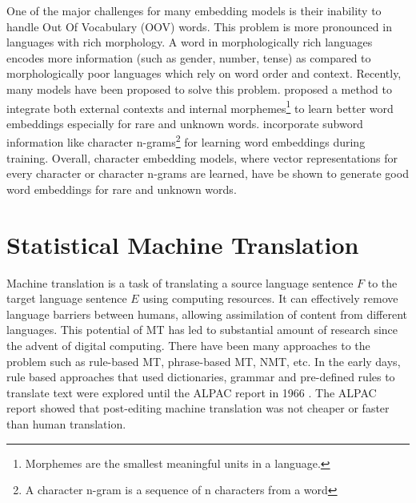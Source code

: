 One of the major challenges for many embedding models is their inability to handle Out Of Vocabulary (OOV) words.  This problem is more pronounced in languages with rich morphology. A word in morphologically rich languages encodes more information (such as gender, number, tense) as compared to morphologically poor languages which rely on word order and context. Recently, many models have been proposed to solve this problem. \cite{sun2016inside} proposed a method to integrate both external contexts and internal morphemes\footnote{Morphemes are the smallest meaningful units in a language.} to learn better word embeddings especially for rare and unknown words. \cite{bojanowski2016enriching} incorporate subword information like character n-grams\footnote{A character n-gram is a sequence of n characters from a word} for learning word embeddings during training. Overall, character embedding models, where vector representations for every character or character n-grams are learned, have be shown to generate good word embeddings for rare and unknown words. 

%

%
%
%

\section{Statistical Machine Translation}
Machine translation is a task of translating a source language sentence $F$ to the target language sentence $E$ using computing resources. It can effectively remove language barriers between humans, allowing assimilation of content from different languages. This potential of MT has led to substantial amount of research since the advent of digital computing. There have been many approaches to the problem such as rule-based MT, phrase-based MT, NMT, etc. In the early days, rule based approaches that used dictionaries, grammar and pre-defined rules to translate text were explored until the ALPAC report in 1966 \citep{national1966language}. The ALPAC report showed that post-editing machine translation was not cheaper or faster than human translation. 

